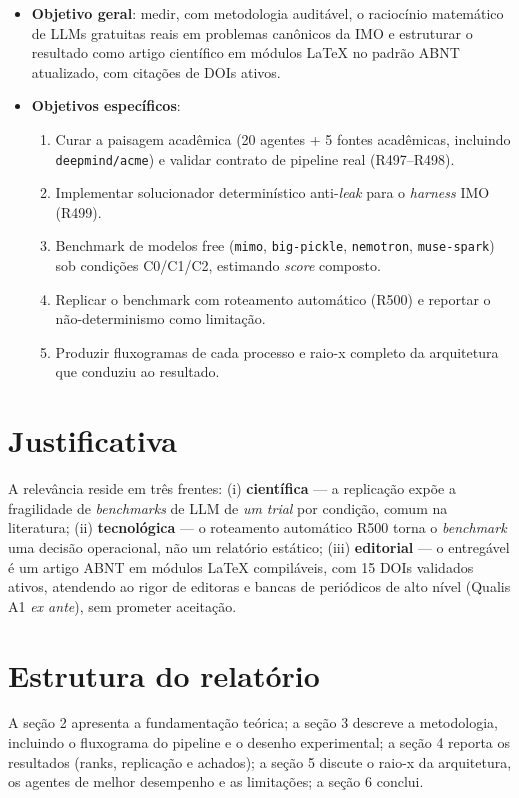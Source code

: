 \begin{itemize}
  \item \textbf{Objetivo geral}: medir, com metodologia auditável, o
  raciocínio matemático de LLMs gratuitas reais em problemas canônicos da
  IMO e estruturar o resultado como artigo científico em módulos LaTeX no
  padrão ABNT atualizado, com citações de DOIs ativos.
  \item \textbf{Objetivos específicos}:
  \begin{enumerate}
    \item Curar a paisagem acadêmica (20 agentes + 5 fontes acadêmicas,
    incluindo \texttt{deepmind/acme}) e validar contrato de pipeline real
    (R497--R498).
    \item Implementar solucionador determinístico anti-\textit{leak} para o
    \textit{harness} IMO (R499).
    \item Benchmark de modelos free (\texttt{mimo}, \texttt{big-pickle},
    \texttt{nemotron}, \texttt{muse-spark}) sob condições C0/C1/C2,
    estimando \textit{score} composto.
    \item Replicar o benchmark com roteamento automático (R500) e reportar o
    não-determinismo como limitação.
    \item Produzir fluxogramas de cada processo e raio-x completo da
    arquitetura que conduziu ao resultado.
  \end{enumerate}
\end{itemize}

\section{Justificativa}

A relevância reside em três frentes: (i) \textbf{científica} — a replicação
expõe a fragilidade de \textit{benchmarks} de LLM de \textit{um trial} por
condição, comum na literatura; (ii) \textbf{tecnológica} — o roteamento
automático R500 torna o \textit{benchmark} uma decisão operacional, não um
relatório estático; (iii) \textbf{editorial} — o entregável é um artigo ABNT
em módulos LaTeX compiláveis, com 15 DOIs validados ativos, atendendo ao
rigor de editoras e bancas de periódicos de alto nível (Qualis A1 \textit{ex
ante}), sem prometer aceitação.

\section{Estrutura do relatório}

A seção 2 apresenta a fundamentação teórica; a seção 3 descreve a
metodologia, incluindo o fluxograma do pipeline e o desenho experimental; a
seção 4 reporta os resultados (ranks, replicação e achados); a seção 5
discute o raio-x da arquitetura, os agentes de melhor desempenho e as
limitações; a seção 6 conclui.